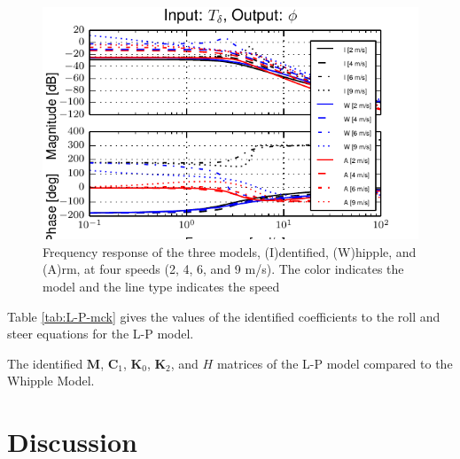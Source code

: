\documentclass[a4paper]{article}
\begin{document}
\begin{figure}
  \label{fig:L-P-Tdel-Phi}
  \includegraphics[width=5in]{figures/L-P-Tdel-Phi.pdf}
  \caption{Frequency response of the three models, (I)dentified, (W)hipple, and
    (A)rm, at four speeds (2, 4, 6, and 9 m/s). The color indicates the model
    and the line type indicates the speed}
\end{figure}

Table \ref{tab:L-P-mck} gives the values of the identified coefficients to the
roll and steer equations for the L-P model.

\begin{table}
  \label{tab:L-P-mck}
  \caption{The identified $\mathbf{M}$, $\mathbf{C}_1$, $\mathbf{K}_0$,
  $\mathbf{K}_2$, and $H$ matrices of the L-P model compared to the Whipple
  Model.}
  
\end{table}

\section{Discussion}
\end{document}
